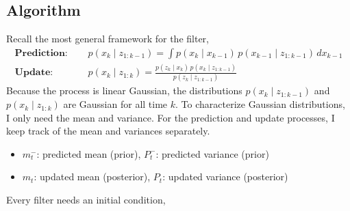 \documentclass{article}
\begin{document}


\subsection{Algorithm}
\label{sec:kalman-algorithm}
Recall the most general framework for the filter,
\begin{equation}
\begin{split}
   \textbf{Prediction: } & \quad p(x_k \mid z_{1:k-1}) = \int p(x_k \mid x_{k-1}) \, p(x_{k-1} \mid z_{1:k-1}) \, dx_{k-1} \\[1ex]
   \textbf{Update: }     & \quad p(x_k \mid z_{1:k}) = \frac{p(z_k \mid x_k) \, p(x_k \mid z_{1:k-1})}{p(z_k \mid z_{1:k-1})}
\end{split}
\end{equation}
Because the process is linear Gaussian, the distributions $p(x_k \mid z_{1:k-1})$ and $p(x_k \mid z_{1:k}) $ are Gaussian for all time $k$. To characterize Gaussian distributions, I only need the mean and variance. For the prediction and update processes, I keep track of the mean and variances separately. 
\begin{itemize}
  \item $m_t^-$: predicted mean (prior), \quad $P_t^-$: predicted variance (prior)
  \item $m_t$: updated mean (posterior), \quad $P_t$: updated variance (posterior)
\end{itemize}
Every filter needs an initial condition, 
\end{document}
